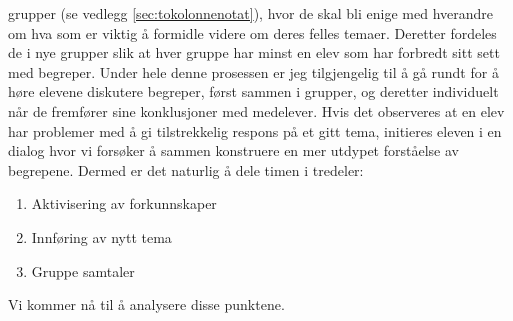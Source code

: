 \documentclass[main.tex]{subfiles}
\begin{document}
grupper (se vedlegg \ref{sec:tokolonnenotat}), hvor de skal bli enige med hverandre om hva som er 
viktig å formidle videre om deres felles temaer. Deretter fordeles de i nye grupper slik at hver 
gruppe har minst en elev som har forbredt sitt sett med begreper. Under hele denne prosessen er jeg 
tilgjengelig til å gå rundt for å høre elevene diskutere begreper, først sammen i grupper, og 
deretter individuelt når de fremfører sine konklusjoner med medelever. Hvis det observeres at en 
elev har problemer med å gi tilstrekkelig respons på et gitt tema, initieres eleven i en dialog 
hvor vi forsøker å sammen konstruere en mer utdypet forståelse av begrepene.
\newline
\newline
Dermed er det naturlig å dele timen i tredeler:
\begin{enumerate}
\item Aktivisering av forkunnskaper  
\item Innføring av nytt tema
\item Gruppe samtaler
\end{enumerate}
Vi kommer nå til å analysere disse punktene.
\end{document}
